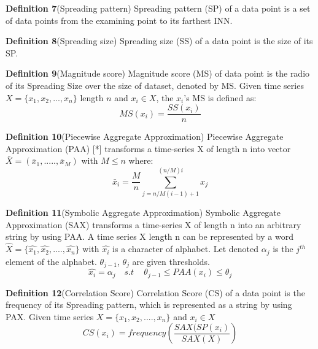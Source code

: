 \par \textbf{Definition 7}(Spreading pattern) Spreading pattern (SP) of a data point is a set of data points from the examining point to its farthest INN. \\

\par \textbf{Definition 8}(Spreading size) Spreading size (SS) of a data point is the size of its SP. \\

\par \textbf{Definition 9}(Magnitude score) Magnitude score (MS) of data point is the radio of its Spreading Size over the size of dataset, denoted by MS. Given time series $ X = \{x_1, x_2, ..., x_n\} $ length $ n $ and $ x_i \in X $, the $ x_i $'s MS is defined as:
\begin{equation}\label{key}
MS(x_i) = \frac{SS(x_i)}{n}
\end{equation}

\par \textbf{Definition 10}(Piecewise Aggregate Approximation) Piecewise Aggregate Approximation (PAA) [*] transforms a time-series X of length n into vector $ \bar{X}=(\bar{x}_{1},.....,\bar{x}_{M}) $ with $ M \leq n $ where: \begin{equation}\label{PAA}
\bar{x}_{i} = \frac{M}{n} \sum_{j=n/M(i-1)+1}^{(n/M)i} x_{j}
\end{equation}

\par \textbf{Definition 11}(Symbolic Aggregate Approximation) Symbolic Aggregate Approximation (SAX) transforms a time-series X of length n into an arbitrary string by using PAA. A time series X length n can be represented by a word $ \hat{X} = \{\hat{x_1},\hat{x_2},....,\hat{x_n}\} $ with $ \hat{x_i} $ is a character of alphabet. Let denoted $ \alpha_j $ is the $ j^{th} $ element of the alphabet. $ \theta_{j-1} $, $ \theta_{j} $ are given thresholds.  
\begin{equation}\label{SAX}
\hat{x_i} = \alpha_j \,\,\,\,\,\, s.t \,\,\,\,\,\,\, \theta_{j-1} \leq PAA(x_i) \leq \theta_{j}
\end{equation}

\par \textbf{Definition 12}(Correlation Score) Correlation Score (CS) of a data point is the frequency of its Spreading pattern, which is represented as a string by using PAX. Given time series $ X = \{x_1,x_2,....,x_n\} $ and $ x_i \in X $
\begin{equation}\label{key}
CS(x_i) = frequency\left(\frac{SAX(SP(x_i)}{SAX(X)}\right) 
\end{equation}

